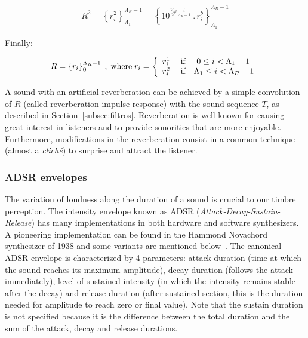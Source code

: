 \begin{equation}\label{eq:p2rev}
    R^2=\left\{r_i^2\right\}_{\Lambda_1}^{\Lambda_R-1}=\left\{10^{\frac{V_{dB}}{20}\frac{i}{\Lambda_R-1}}\,.\,r_i^b\right\}_{\Lambda_1}^{\Lambda_R-1}
\end{equation}

Finally:

\begin{equation}\label{eq:rev}
	R=\left\{r_i\right\}_0^{\Lambda_R-1}\;,\; \text{where} \; r_i=\left\{
        \begin{array}{l l}
            r_i^1\;  & \text{if }\quad 0\leq i<\Lambda_1-1 \\
                                     r_i^2 \; & \text{if}\quad \Lambda_1 \leq i < \Lambda_R-1 \\
        \end{array} \right.
\end{equation}

A sound with an artificial reverberation can be achieved by a simple convolution of $R$ (called reverberation impulse response) with the sound sequence $T$, as described in Section~\ref{subsec:filtros}. Reverberation is well known for causing great interest in listeners and to provide sonorities that are more enjoyable. Furthermore, modifications in the reverberation consist in a common technique (almost a \textit{clich\'{e}}) to surprise and attract the listener.

\subsubsection{ADSR envelopes}
The variation of loudness along the duration of a sound is crucial to our timbre perception.
The intensity envelope known as ADSR (\emph{Attack-Decay-Sustain-Release}) has many implementations in both hardware and software synthesizers. A pioneering implementation can be found in the Hammond Novachord synthesizer of 1938 and some variants are mentioned below~\cite{ADSR}. The canonical ADSR envelope is characterized by 4 parameters: attack duration (time at which the sound reaches its maximum amplitude), decay duration (follows the attack immediately), level of sustained intensity (in which the intensity remains stable after the decay) and release duration (after sustained section, this is the duration needed for amplitude to reach zero or final value).
Note that the sustain duration is not specified because it is the difference between the total duration and the sum of the attack, decay and release durations.

